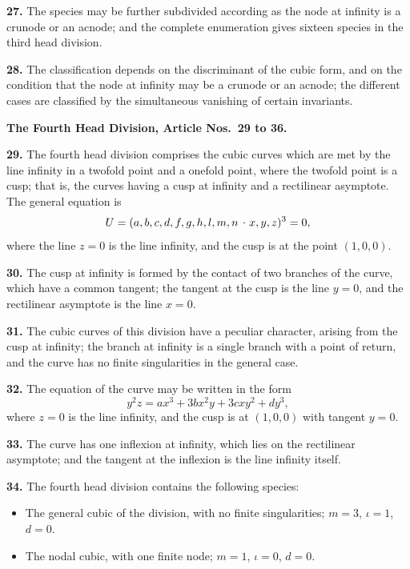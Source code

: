 \documentclass[11pt,a4paper]{article}
\theoremstyle{plain}
\theoremstyle{definition}
\newcommand{\lc}{\kern.17em\raise.5ex\hbox{.}\kern.08em}  %
\begin{document}
\textbf{27.} The species may be further subdivided according as the node at infinity is a crunode or an acnode; and the complete enumeration gives sixteen species in the third head division.

\textbf{28.} The classification depends on the discriminant of the cubic form, and on the condition that the node at infinity may be a crunode or an acnode; the different cases are classified by the simultaneous vanishing of certain invariants.

\bigskip

\noindent\textbf{The Fourth Head Division, Article Nos.~29 to 36.}

\medskip

\textbf{29.} The fourth head division comprises the cubic curves which are met by the line infinity in a twofold point and a onefold point, where the twofold point is a cusp; that is, the curves having a cusp at infinity and a rectilinear asymptote. The general equation is
\[
U = (a, b, c, d, f, g, h, l, m, n \mathbin{\lc} x, y, z)^3 = 0,
\]
where the line $z = 0$ is the line infinity, and the cusp is at the point $(1, 0, 0)$.

\textbf{30.} The cusp at infinity is formed by the contact of two branches of the curve, which have a common tangent; the tangent at the cusp is the line $y = 0$, and the rectilinear asymptote is the line $x = 0$.

\textbf{31.} The cubic curves of this division have a peculiar character, arising from the cusp at infinity; the branch at infinity is a single branch with a point of return, and the curve has no finite singularities in the general case.

\textbf{32.} The equation of the curve may be written in the form
\[
y^2z = ax^3 + 3bx^2y + 3cxy^2 + dy^3,
\]
where $z = 0$ is the line infinity, and the cusp is at $(1, 0, 0)$ with tangent $y = 0$.

\textbf{33.} The curve has one inflexion at infinity, which lies on the rectilinear asymptote; and the tangent at the inflexion is the line infinity itself.

\textbf{34.} The fourth head division contains the following species:
\begin{itemize}
\item[(1)] The general cubic of the division, with no finite singularities; $m = 3$, $\iota = 1$, $d = 0$.
\item[(2)] The nodal cubic, with one finite node; $m = 1$, $\iota = 0$, $d = 0$.
\end{itemize}
\end{document}
